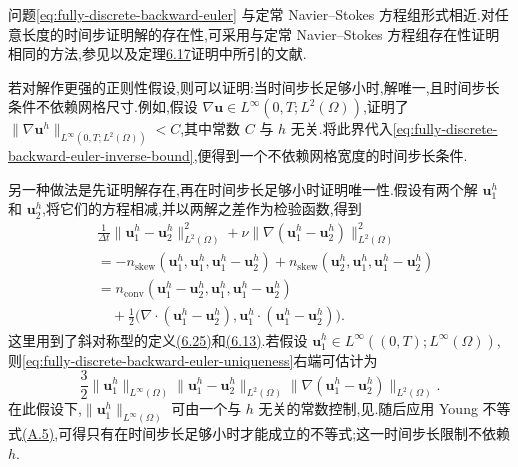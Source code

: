 \begin{note}[关于解的存在性与唯一性]
\label{note:fully-discrete-solution-existence-uniqueness}
问题\cref{eq:fully-discrete-backward-euler} 与定常 Navier--Stokes 方程组形式相近.对任意长度的时间步证明解的存在性,可采用与定常 Navier--Stokes 方程组存在性证明相同的方法,参见\textcite[第 15.2 节]{MarionTemam1998}以及定理\hyperref[thm:steady-ns-existence]{6.17}证明中所引的文献.

若对解作更强的正则性假设,则可以证明:当时间步长足够小时,解唯一,且时间步长条件不依赖网格尺寸.例如,假设 $\nabla\bm{u}\in L^\infty(0,T;L^2(\Omega))$,\textcite[式(3.15)]{HeywoodRannacher1990}证明了
$\|\nabla\bm{u}^h\|_{L^\infty(0,T;L^2(\Omega))}<C$,其中常数 $C$ 与 $h$ 无关.将此界代入\cref{eq:fully-discrete-backward-euler-inverse-bound},便得到一个不依赖网格宽度的时间步长条件.

另一种做法是先证明解存在,再在时间步长足够小时证明唯一性.假设有两个解 $\bm{u}_1^h$ 和 $\bm{u}_2^h$,将它们的方程相减,并以两解之差作为检验函数,得到
\begin{equation}\label{eq:fully-discrete-backward-euler-uniqueness}
\begin{aligned}
 &\frac1{\Delta t}\|\bm{u}_1^h-\bm{u}_2^h\|_{L^2(\Omega)}^2
    +\nu\|\nabla(\bm{u}_1^h-\bm{u}_2^h)\|_{L^2(\Omega)}^2\\
 &=-n_{\mathrm{skew}}(\bm{u}_1^h,\bm{u}_1^h,
                   \bm{u}_1^h-\bm{u}_2^h)
    +n_{\mathrm{skew}}(\bm{u}_2^h,\bm{u}_1^h,
                   \bm{u}_1^h-\bm{u}_2^h)\\
 &=n_{\mathrm{conv}}(\bm{u}_1^h-\bm{u}_2^h,\bm{u}_1^h,
                    \bm{u}_1^h-\bm{u}_2^h)\\
 &\quad+\frac12\bigl(\nabla\cdot(\bm{u}_1^h-\bm{u}_2^h),
                \bm{u}_1^h\cdot(\bm{u}_1^h-\bm{u}_2^h)\bigr).
\end{aligned}
\end{equation}
这里用到了斜对称型的定义\hyperref[eq:steady-ns-nskew-definition]{(6.25)}和\hyperref[eq:steady-ns-conv-form-4]{(6.13)}.若假设 $\bm{u}_1^h\in L^\infty((0,T);L^\infty(\Omega))$,则\cref{eq:fully-discrete-backward-euler-uniqueness}右端可估计为
\[
  \frac32\|\bm{u}_1^h\|_{L^\infty(\Omega)}
       \|\bm{u}_1^h-\bm{u}_2^h\|_{L^2(\Omega)}
       \|\nabla(\bm{u}_1^h-\bm{u}_2^h)\|_{L^2(\Omega)}.
\]
在此假设下,$\|\bm{u}_1^h\|_{L^\infty(\Omega)}$ 可由一个与 $h$ 无关的常数控制,见\textcite[式(2.16)及注记 5.1]{deFrutos2008}.随后应用 Young 不等式\hyperref[eq:appendix-a-5]{(A.5)},可得只有在时间步长足够小时才能成立的不等式;这一时间步长限制不依赖 $h$.
\end{note}

